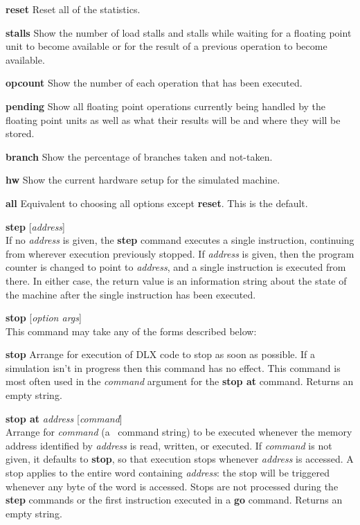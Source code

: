 \begin{mylist}
\begin{mylist}
\begin{mylist}
\item[{\bf reset} \hfill]
Reset all of the statistics.
\item[{\bf stalls} \hfill]
Show the number of load stalls and stalls while waiting for a floating
point unit to become available or for the result of a previous
operation to become available.
\item[{\bf opcount} \hfill]
Show the number of each operation that has been executed.
\item[{\bf pending} \hfill]
Show all floating point operations currently being handled by the
floating point units as well as what their results will be and where
they will be stored.
\item[{\bf branch} \hfill]
Show the percentage of branches taken and not-taken.
\item[{\bf hw} \hfill]
Show the current hardware setup for the simulated machine.
\item[{\bf all} \hfill]
Equivalent to choosing all options except {\bf reset}.  This is the default.
\end{mylist}

\item[{\bf step} {[}{\em address}{]}]
\nopagebreak \hfill \\
If no {\em address} is given, the {\bf step} command executes a single
instruction, continuing from wherever execution previously stopped.
If {\em address} is given, then the program counter is changed to
point to {\em address}, and a single instruction is executed from
there.  In either case, the return value is an information string
about the state of the machine after the single instruction has been
executed.

\item[{\bf stop} {[}{\em option args}{]}]
\nopagebreak \hfill \\
This command may take any of the forms described below:

\begin{mylist}
\item[{\bf stop}\hfill]
Arrange for execution of DLX code to stop as soon as possible.  If a
simulation isn't in progress then this command has no effect.
This command is most often used in the {\em command}
argument for the {\bf stop at} command.  Returns an empty string.

\item[{\bf stop at} {\em address} {[}{\em command}{]}]
\nopagebreak \hfill \\
Arrange for {\em command} (a \dlxsim\ command string) to be executed
whenever the memory address identified by {\em address} is read,
written, or executed.  If {\em command} is not given, it defaults to
{\bf stop}, so that execution stops whenever {\em address} is
accessed.  A stop applies to the entire word containing {\em address}:
the stop will be triggered whenever any byte of the word is accessed.
Stops are not processed during the {\bf step} commands or the first
instruction executed in a {\bf go} command.  Returns an empty string.


\end{mylist}
\end{mylist}
\end{mylist}
